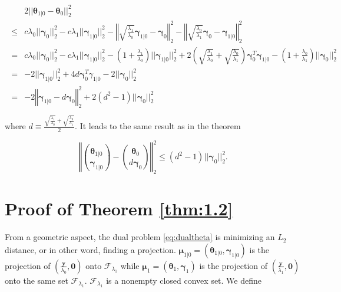 \begin{gather}
    \begin{aligned}
        &2||\boldsymbol\theta_{1|0}-\boldsymbol\theta_{0}||_2^2\\\leq& c\lambda_0||\boldsymbol\gamma_{0}||_2^2-c\lambda_1||\boldsymbol\gamma_{1|0}||_2^2-\left\Vert\sqrt{\frac{\lambda_1}{\lambda_0}}\boldsymbol\gamma_{1|0}-\boldsymbol\gamma_{0}\right\Vert_2^2-\left\Vert\sqrt{\frac{\lambda_0}{\lambda_1}}\boldsymbol\gamma_{0}-\boldsymbol\gamma_{1|0}\right\Vert_2^2\\
        =&c\lambda_0||\boldsymbol\gamma_{0}||_2^2-c\lambda_1||\boldsymbol\gamma_{1|0}||_2^2-\left(1+\frac{\lambda_1}{\lambda_0}\right)||\boldsymbol\gamma_{1|0}||_2^2+2\left(\sqrt{\frac{\lambda_1}{\lambda_0}}+\sqrt{\frac{\lambda_0}{\lambda_1}}\right)\boldsymbol\gamma_{0}^T\boldsymbol\gamma_{1|0}-\left(1+\frac{\lambda_0}{\lambda_1}\right)||\boldsymbol\gamma_{0}||_2^2\\
        =&-2||\boldsymbol\gamma_{1|0}||_2^2+4d\boldsymbol\gamma_{0}^T\gamma_{1|0}-2||\boldsymbol\gamma_{0}||_2^2\\
        =&-2\left\Vert\boldsymbol\gamma_{1|0}-d\boldsymbol\gamma_{0}\right\Vert_2^2+2(d^2-1)||\boldsymbol\gamma_{0}||_2^2\\
    \end{aligned}
\end{gather}
where $d\equiv \frac{\sqrt{\frac{\lambda_1}{\lambda_0}}+\sqrt{\frac{\lambda_0}{\lambda_1}}}{2}$. It leads to the same result as in the theorem

\begin{equation}
     \left\Vert\binom{\boldsymbol\theta_{1|0}}{\boldsymbol\gamma_{1|0}}-\binom{\boldsymbol\theta_{0}}{d\boldsymbol\gamma_{0}}\right\Vert_2^2\leq (d^2-1)||\boldsymbol\gamma_{0}||_2^2.
\end{equation}

\section{Proof of Theorem \ref{thm:1.2}}

From a geometric aspect, the dual problem \eqref{eq:dualtheta} is minimizing an $L_2$ distance, or in other word, finding a projection. $\boldsymbol\mu_{1|0}=(\boldsymbol \theta_{1|0},\boldsymbol \gamma_{1|0})$ is the projection of $(\frac{\boldsymbol y}{\lambda_0},\boldsymbol0)$ onto $\mathcal{F}_{\lambda_1}$ while $\boldsymbol\mu_1=(\boldsymbol \theta_{1},\boldsymbol \gamma_{1})$ is the projection of $(\frac{\boldsymbol y}{\lambda_1},\boldsymbol0)$ onto the same set $\mathcal{F}_{\lambda_1}$. $\mathcal{F}_{\lambda_1}$ is a nonempty closed convex set. We define


